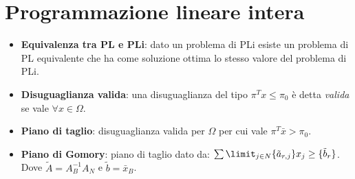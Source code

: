 \documentclass[fleqn,12pt]{article}
\begin{document}
\section{Programmazione lineare intera}
\begin{itemize}
    \item \textbf{Equivalenza tra PL e PLi}: dato un problema di PLi esiste un
        problema di PL equivalente che ha come soluzione ottima lo stesso
        valore del problema di PLi.
    \item \textbf{Disuguaglianza valida}: una disuguaglianza del tipo
        $\pi^Tx \le \pi_0$ è detta \textit{valida} se vale $\forall x \in
        \Omega$.
    \item \textbf{Piano di taglio}: disuguaglianza valida per $\Omega$ per cui
        vale $\pi^T\bar{x} > \pi_0$.
    \item \textbf{Piano di Gomory}: piano di taglio dato da: $\sum\limit_{j
        \in N} \{\tilde{a}_{r,j}\}x_j \ge \{\tilde{b}_r\}$.
        Dove $\tilde{A} = A_B^{-1}A_N$ e $\tilde{b}=\bar{x}_B$.
\end{itemize}
\end{document}
